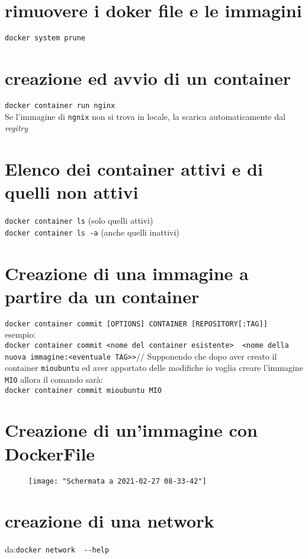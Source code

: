 \documentclass[10pt,a4paper]{report}
\begin{document}
	\section{rimuovere i doker file e le immagini}
	\verb|docker system prune|
	\section{creazione ed avvio di un container}
	\verb|docker container run nginx|\\
	Se l'immagine di \verb|ngnix| non si trova in locale, la scarica automaticamente dal \textit{regitry}  
	\section{Elenco dei container attivi e di quelli non attivi}
	\verb|docker container ls| (solo quelli attivi)\\
	\verb|docker container ls -a| (anche quelli inattivi)
	\section{Creazione di una immagine a partire da un container}
	\verb|docker container commit [OPTIONS] CONTAINER [REPOSITORY[:TAG]]|\\
	esempio:\\ 
	\verb|docker container commit <nome del container esistente>  <nome della nuova immagine:<eventuale TAG>>|//
	Supponendo che dopo aver creato il container \verb|mioubuntu| ed aver apportato delle modifiche io voglia creare l'immagine \verb|MIO| allora il comando sarà:\\
	\verb|docker container commit mioubuntu MIO|
	\section{Creazione di un'immagine con DockerFile}
	\begin{figure}[h]
		\centering
		\texttt{[image: "Schermata a 2021-02-27 08-33-42"]}
		\caption{}
		\label{fig:schermata-a-2021-02-27-08-33-42}
	\end{figure}
	
	\section{creazione di una network}
	da:\verb|docker network  --help|\\

	
	
\end{document}
